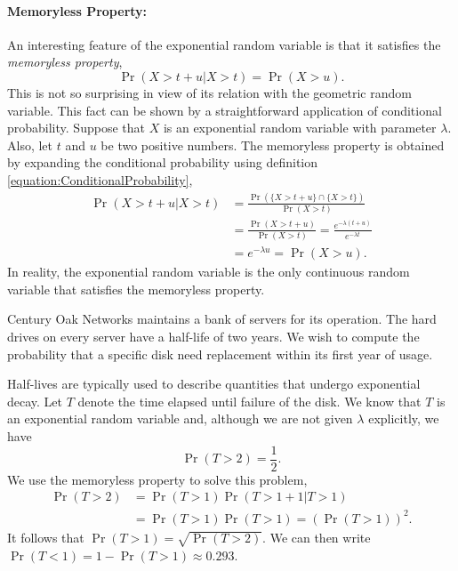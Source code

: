\paragraph{Memoryless Property:}
An interesting feature of the exponential random variable is that it satisfies the \emph{memoryless property}, 
\begin{equation*}
\Pr (X > t + u | X > t) = \Pr (X > u).
\end{equation*}
This is not so surprising in view of its relation with the geometric random variable.
This fact can be shown by a straightforward application of conditional probability.
Suppose that $X$ is an exponential random variable with parameter $\lambda$.
Also, let $t$ and $u$ be two positive numbers.
The memoryless property is obtained by expanding the conditional probability using definition \eqref{equation:ConditionalProbability},
\begin{equation*}
\begin{split}
\Pr (X > t + u | X > t)
&= \frac{\Pr( \{ X > t + u \} \cap \{ X > t \} ) }{ \Pr ( X > t ) } \\
&= \frac{\Pr( X > t + u ) }{ \Pr ( X > t ) }
= \frac{e^{- \lambda (t + u)} }{ e^{- \lambda t } } \\
&= e^{- \lambda u } = \Pr (X > u).
\end{split}
\end{equation*}
In reality, the exponential random variable is the only continuous random variable that satisfies the memoryless property.

\begin{example}
Century Oak Networks maintains a bank of servers for its operation.
The hard drives on every server have a half-life of two years.
We wish to compute the probability that a specific disk need replacement within its first year of usage.

Half-lives are typically used to describe quantities that undergo exponential decay.
Let $T$ denote the time elapsed until failure of the disk.
We know that $T$ is an exponential random variable and, although we are not given $\lambda$ explicitly, we have
\begin{equation*}
\Pr ( T > 2 ) = \frac{1}{2} .
\end{equation*}
We use the memoryless property to solve this problem,
\begin{equation*}
\begin{split}
\Pr (T > 2) &= \Pr (T > 1) \Pr (T > 1 + 1 | T > 1) \\
&= \Pr (T > 1) \Pr (T > 1)
= \left( \Pr(T > 1) \right)^2 .
\end{split}
\end{equation*}
It follows that $\Pr (T > 1) = \sqrt{ \Pr (T > 2) }$.
We can then write $\Pr (T < 1) = 1 - \Pr (T > 1) \approx 0.293$.
\end{example}


